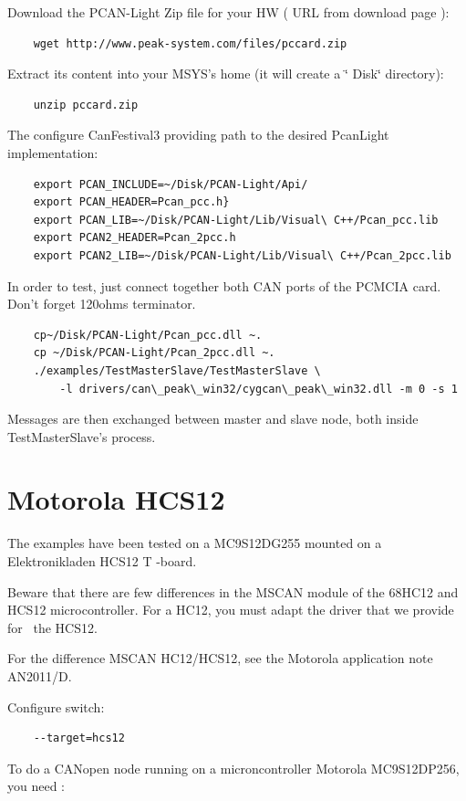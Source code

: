 \documentclass[12pt,english,a4paper]{book}
\newcommand{\canopen}{CANopen }
\begin{document}
Download the PCAN-Light Zip file for your HW ( URL from download page
):

\begin{verbatim}
	wget http://www.peak-system.com/files/pccard.zip
\end{verbatim}
Extract its content into your MSYS's home (it will create a \char`\"{}
Disk\char`\"{} directory):

\begin{verbatim}
	unzip pccard.zip
\end{verbatim}
The configure CanFestival3 providing path to the desired PcanLight
implementation:

\begin{verbatim}
	export PCAN_INCLUDE=~/Disk/PCAN-Light/Api/
	export PCAN_HEADER=Pcan_pcc.h}
	export PCAN_LIB=~/Disk/PCAN-Light/Lib/Visual\ C++/Pcan_pcc.lib
	export PCAN2_HEADER=Pcan_2pcc.h
	export PCAN2_LIB=~/Disk/PCAN-Light/Lib/Visual\ C++/Pcan_2pcc.lib
\end{verbatim}

In order to test, just connect together both CAN ports of the PCMCIA
card. Don't forget 120ohms terminator.

\begin{verbatim}
	cp~/Disk/PCAN-Light/Pcan_pcc.dll ~.
	cp ~/Disk/PCAN-Light/Pcan_2pcc.dll ~.
	./examples/TestMasterSlave/TestMasterSlave \
		-l drivers/can\_peak\_win32/cygcan\_peak\_win32.dll -m 0 -s 1
\end{verbatim}
Messages are then exchanged between master and slave node, both inside
TestMasterSlave's process.

\section{Motorola HCS12}

The examples have been tested on a MC9S12DG255 mounted on a Elektronikladen
HCS12 T -board.

Beware that there are few differences in the MSCAN module of the 68HC12
and HCS12 microcontroller. For a HC12, you must adapt the driver that
we provide for \ the HCS12.

For the difference MSCAN HC12/HCS12, see the Motorola application
note AN2011/D.

Configure switch:

\begin{verbatim}
	--target=hcs12
\end{verbatim}

To do a \canopen node running on a microncontroller Motorola MC9S12DP256,
you need :
\end{document}

